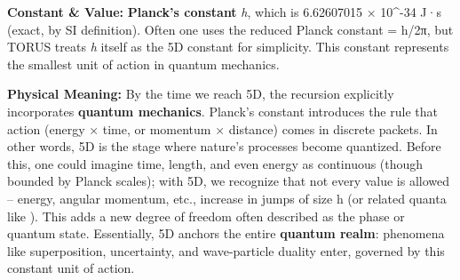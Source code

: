 \documentclass[
]{article}
\begin{document}
{\textbf{Constant \& Value:} \textbf{Planck's constant} \emph{h}, which
is 6.62607015 × 10\^{}-34 J·s (exact, by SI definition)\hspace{0pt}.
Often one uses the reduced Planck constant \hbar = h/2π, but TORUS treats
\emph{h} itself as the 5D constant for simplicity. This constant
represents the smallest unit of action in quantum mechanics.

\textbf{Physical Meaning:} By the time we reach 5D, the recursion
explicitly incorporates \textbf{quantum mechanics}. Planck's constant
introduces the rule that action (energy × time, or momentum × distance)
comes in discrete packets. In other words, 5D is the stage where
nature's processes become quantized\hspace{0pt}. Before this, one could
imagine time, length, and even energy as continuous (though bounded by
Planck scales); with 5D, we recognize that not every value is allowed --
energy, angular momentum, etc., increase in jumps of size h (or related
quanta like \hbar). This adds a new degree of freedom often described as the
phase or quantum state. Essentially, 5D anchors the entire
\textbf{quantum realm}: phenomena like superposition, uncertainty, and
wave-particle duality enter, governed by this constant unit of action.

}
\end{document}
